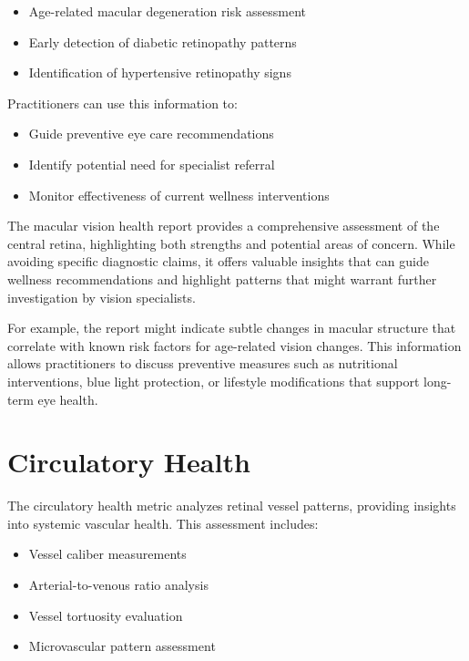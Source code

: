 \documentclass[
  Letterpaper,
]{scrbook}
\providecommand{\tightlist}{%
  \setlength{\itemsep}{0pt}\setlength{\parskip}{0pt}}\usepackage{longtable,booktabs,array}
\begin{document}
\begin{itemize}
\tightlist
\item
  Age-related macular degeneration risk assessment
\item
  Early detection of diabetic retinopathy patterns
\item
  Identification of hypertensive retinopathy signs
\end{itemize}

Practitioners can use this information to:

\begin{itemize}
\tightlist
\item
  Guide preventive eye care recommendations
\item
  Identify potential need for specialist referral
\item
  Monitor effectiveness of current wellness interventions
\end{itemize}

The macular vision health report provides a comprehensive assessment of
the central retina, highlighting both strengths and potential areas of
concern. While avoiding specific diagnostic claims, it offers valuable
insights that can guide wellness recommendations and highlight patterns
that might warrant further investigation by vision specialists.

For example, the report might indicate subtle changes in macular
structure that correlate with known risk factors for age-related vision
changes. This information allows practitioners to discuss preventive
measures such as nutritional interventions, blue light protection, or
lifestyle modifications that support long-term eye health.

\section{Circulatory Health}\label{circulatory-health}

The circulatory health metric analyzes retinal vessel patterns,
providing insights into systemic vascular health. This assessment
includes:

\begin{itemize}
\tightlist
\item
  Vessel caliber measurements
\item
  Arterial-to-venous ratio analysis
\item
  Vessel tortuosity evaluation
\item
  Microvascular pattern assessment
\end{itemize}
\end{document}
